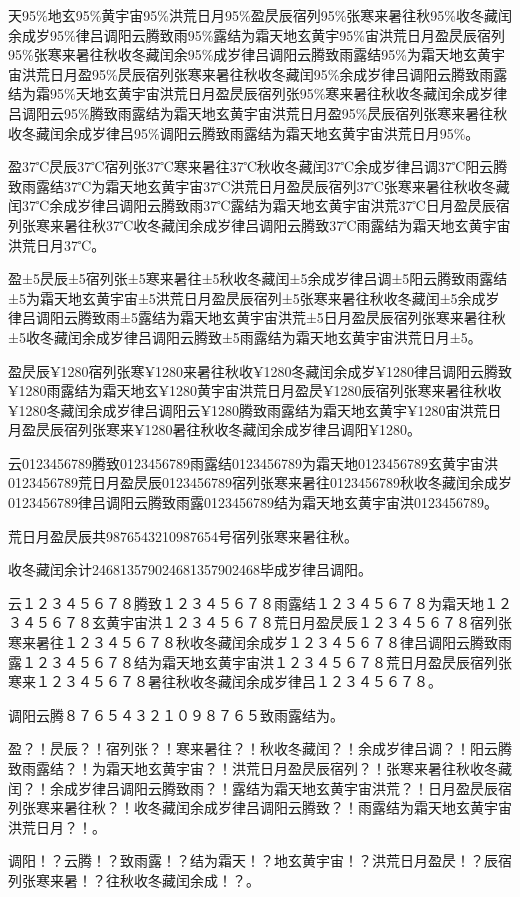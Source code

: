 \documentclass[12pt]{article}
\begin{document}
天95\%地玄95\%黄宇宙95\%洪荒日月95\%盈昃辰宿列95\%张寒来暑往秋95\%收冬藏闰余成岁95\%律吕调阳云腾致雨95\%露结为霜天地玄黄宇95\%宙洪荒日月盈昃辰宿列95\%张寒来暑往秋收冬藏闰余95\%成岁律吕调阳云腾致雨露结95\%为霜天地玄黄宇宙洪荒日月盈95\%昃辰宿列张寒来暑往秋收冬藏闰95\%余成岁律吕调阳云腾致雨露结为霜95\%天地玄黄宇宙洪荒日月盈昃辰宿列张95\%寒来暑往秋收冬藏闰余成岁律吕调阳云95\%腾致雨露结为霜天地玄黄宇宙洪荒日月盈95\%昃辰宿列张寒来暑往秋收冬藏闰余成岁律吕95\%调阳云腾致雨露结为霜天地玄黄宇宙洪荒日月95\%。

盈37℃昃辰37℃宿列张37℃寒来暑往37℃秋收冬藏闰37℃余成岁律吕调37℃阳云腾致雨露结37℃为霜天地玄黄宇宙37℃洪荒日月盈昃辰宿列37℃张寒来暑往秋收冬藏闰37℃余成岁律吕调阳云腾致雨37℃露结为霜天地玄黄宇宙洪荒37℃日月盈昃辰宿列张寒来暑往秋37℃收冬藏闰余成岁律吕调阳云腾致37℃雨露结为霜天地玄黄宇宙洪荒日月37℃。

盈±5昃辰±5宿列张±5寒来暑往±5秋收冬藏闰±5余成岁律吕调±5阳云腾致雨露结±5为霜天地玄黄宇宙±5洪荒日月盈昃辰宿列±5张寒来暑往秋收冬藏闰±5余成岁律吕调阳云腾致雨±5露结为霜天地玄黄宇宙洪荒±5日月盈昃辰宿列张寒来暑往秋±5收冬藏闰余成岁律吕调阳云腾致±5雨露结为霜天地玄黄宇宙洪荒日月±5。

盈昃辰¥1280宿列张寒¥1280来暑往秋收¥1280冬藏闰余成岁¥1280律吕调阳云腾致¥1280雨露结为霜天地玄¥1280黄宇宙洪荒日月盈昃¥1280辰宿列张寒来暑往秋收¥1280冬藏闰余成岁律吕调阳云¥1280腾致雨露结为霜天地玄黄宇¥1280宙洪荒日月盈昃辰宿列张寒来¥1280暑往秋收冬藏闰余成岁律吕调阳¥1280。

云0123456789腾致0123456789雨露结0123456789为霜天地0123456789玄黄宇宙洪0123456789荒日月盈昃辰0123456789宿列张寒来暑往0123456789秋收冬藏闰余成岁0123456789律吕调阳云腾致雨露0123456789结为霜天地玄黄宇宙洪0123456789。

荒日月盈昃辰共9876543210987654号宿列张寒来暑往秋。

收冬藏闰余计246813579024681357902468毕成岁律吕调阳。

云１２３４５６７８腾致１２３４５６７８雨露结１２３４５６７８为霜天地１２３４５６７８玄黄宇宙洪１２３４５６７８荒日月盈昃辰１２３４５６７８宿列张寒来暑往１２３４５６７８秋收冬藏闰余成岁１２３４５６７８律吕调阳云腾致雨露１２３４５６７８结为霜天地玄黄宇宙洪１２３４５６７８荒日月盈昃辰宿列张寒来１２３４５６７８暑往秋收冬藏闰余成岁律吕１２３４５６７８。

调阳云腾８７６５４３２１０９８７６５致雨露结为。

盈？！昃辰？！宿列张？！寒来暑往？！秋收冬藏闰？！余成岁律吕调？！阳云腾致雨露结？！为霜天地玄黄宇宙？！洪荒日月盈昃辰宿列？！张寒来暑往秋收冬藏闰？！余成岁律吕调阳云腾致雨？！露结为霜天地玄黄宇宙洪荒？！日月盈昃辰宿列张寒来暑往秋？！收冬藏闰余成岁律吕调阳云腾致？！雨露结为霜天地玄黄宇宙洪荒日月？！。

调阳！？云腾！？致雨露！？结为霜天！？地玄黄宇宙！？洪荒日月盈昃！？辰宿列张寒来暑！？往秋收冬藏闰余成！？。
\end{document}
